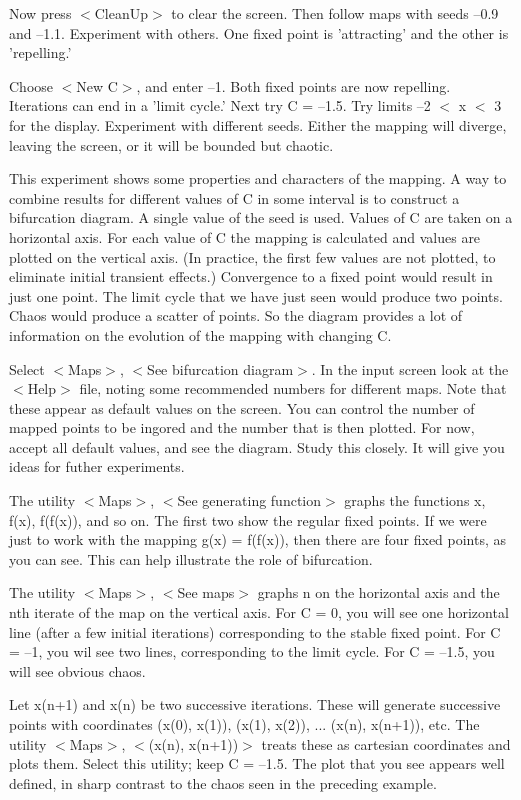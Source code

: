    Now press $<$CleanUp$>$ to clear the screen. Then follow maps with seeds
--0.9 and --1.1. Experiment with others. One fixed point is 'attracting'
and the other is 'repelling.'

   Choose $<$New C$>$, and enter --1. Both fixed points are now repelling.
Iterations can end in a 'limit cycle.' Next try C = --1.5. Try limits
--2 $<$ x $<$ 3 for the display. Experiment with different seeds. Either
the mapping will diverge, leaving the screen, or it will be bounded
but chaotic.

   This experiment shows some properties and characters of the mapping.
A way to combine results for different values of C in some interval is
to construct a bifurcation diagram. A single value of the seed is used.
Values of C are taken on a horizontal axis. For each value of C the
mapping is calculated and values are plotted on the vertical axis.
   (In practice, the first few values are not plotted, to eliminate
initial transient effects.) Convergence to a fixed point would result
in just one point. The limit cycle that we have just seen would produce
two points. Chaos would produce a scatter of points. So the diagram
provides a lot of information on the evolution of the mapping with
changing C.

   Select $<$Maps$>$, $<$See bifurcation diagram$>$. In the input screen look
at the $<$Help$>$ file, noting some recommended numbers for different maps.
Note that these appear as default values on the screen. You can control
the number of mapped points to be ingored and the number that is then
plotted. For now, accept all default values, and see the diagram. Study
this closely. It will give you ideas for futher experiments.

   The utility $<$Maps$>$, $<$See generating function$>$ graphs the functions
x, f(x), f(f(x)), and so on. The first two show the regular fixed points.
If we were just to work with the mapping g(x) = f(f(x)), then there are
four fixed points, as you can see. This can help illustrate the role of
bifurcation.

   The utility $<$Maps$>$, $<$See maps$>$ graphs n on the horizontal axis and
the nth iterate of the map on the vertical axis. For C = 0, you will see
one horizontal line (after a few initial iterations) corresponding to
the stable fixed point. For C = --1, you wil see two lines, corresponding
to the limit cycle. For C = --1.5, you will see obvious chaos.

   Let x(n+1) and x(n) be two successive iterations. These will generate
successive points with coordinates (x(0), x(1)), (x(1), x(2)), ...
(x(n), x(n+1)), etc. The utility $<$Maps$>$, $<$(x(n), x(n+1))$>$ treats these
as cartesian coordinates and plots them. Select this utility; keep
C = --1.5. The plot that you see appears well defined, in sharp contrast
to the chaos seen in the preceding example.

